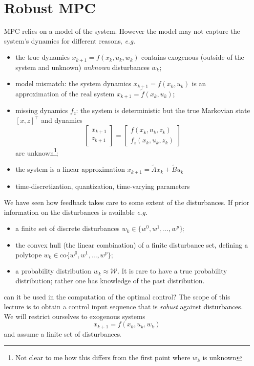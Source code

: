 \chapter{Robust MPC}
\label{sec:robust-MPC}

MPC relies on a model of the system. However the model may not capture the system's dynamics for different reasons, \textit{e.g.}
\begin{itemize}
\item the true dynamics $x_{k+1} = f(x_k,u_k,w_k)$ contains exogenous (outside of the system and unknown) \emph{unknown} disturbances $w_k$;
\item model mismatch: the system dynamics $x_{k+1} = f(x_k,u_k)$ is an approximation of the real system $x_{k+1} = \tilde{f}(x_k,u_k)$;
\item missing dynamics $f_z$: the system is deterministic but the true Markovian state $[x,z]^\top$ and dynamics
  \begin{equation*}
    \begin{bmatrix}
      x_{k+1} \\ z_{k+1}
    \end{bmatrix} =
    \begin{bmatrix}
      f(x_k,u_k,z_k) \\ f_z(x_k,u_k,z_k)
    \end{bmatrix}
  \end{equation*}
  are unknown\footnote{Not clear to me how this differs from the first point where $w_k$ is unknown};
\item the system is a linear approximation $x_{k+1} = \tilde{A}x_k + \tilde{B}u_k$
\item time-discretization, quantization, time-varying parameters
\end{itemize}
We have seen how feedback takes care to some extent of the disturbances. If prior information on the disturbances is available \textit{e.g.}
\begin{itemize}
\item a finite set of discrete disturbances $w_k\in \{w^0, w^1,\ldots, w^p \}$;
\item the convex hull (the linear combination) of a finite disturbance set, defining a polytope $w_k\in \text{co}\{w^0, w^1,\ldots, w^p \}$;
\item a probability distribution $w_k \approx \mathcal{W}$. It is rare to have a true probability distribution; rather one has knowledge of the past distribution.
\end{itemize}
can it be used in the computation of the optimal control? The scope of this lecture is to obtain a control input sequence that is \emph{robust} against disturbances. We will restrict ourselves to exogenous systems
\begin{equation*}
  x_{k+1} = f(x_k,u_k,w_k)
\end{equation*}
and assume a finite set of disturbances.

